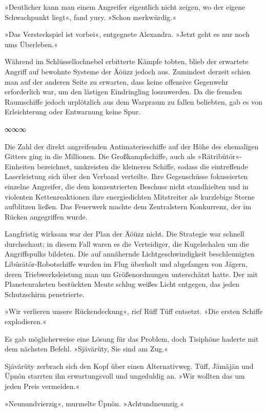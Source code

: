 »Deutlicher kann man einem Angreifer eigentlich nicht zeigen, wo der eigene Schwachpunkt liegt«, fand yury. »Schon merkwürdig.«

»Das Versteckspiel ist vorbei«, entgegnete Alexandra. »Jetzt geht es nur noch ums Überleben.«

Während im Schlüssellochnebel erbitterte Kämpfe tobten, blieb der erwartete Angriff auf bewohnte Systeme der Äöüzz jedoch aus. Zumindest derzeit schien man auf der anderen Seite zu erwarten, dass keine offensive Gegenwehr erforderlich war, um den lästigen Eindringling loszuwerden. Da die fremden Raumschiffe jedoch urplötzlich aus dem Warpraum zu fallen beliebten, gab es von Erleichterung oder Entwarnung keine Spur.

\begin{center}
∞∞∞
\end{center}

Die Zahl der direkt angreifenden Antimaterieschiffe auf der Höhe des ehemaligen Gitters ging in die Millionen. Die Großkampfschiffe, auch als »Rätribütör«-Einheiten bezeichnet, umkreisten die kleineren Schiffe, sodass die eintreffende Laserleistung sich über den Verband verteilte. Ihre Gegenschüsse fokussierten einzelne Angreifer, die dem konzentrierten Beschuss nicht standhielten und in violenten Kettenreaktionen ihre energiedichten Mitstreiter als kurzlebige Sterne aufblitzen ließen. Das Feuerwerk machte dem Zentralstern Konkurrenz, der im Rücken angegriffen wurde.

Langfristig wirksam war der Plan der Äöüzz nicht. Die Strategie war schnell durchschaut; in diesem Fall waren es die Verteidiger, die Kugelschalen um die Angriffspulks bildeten. Die auf annähernde Lichtgeschwindigkeit beschleunigten Libürätör-Robotschiffe wurden im Flug überholt und abgefangen von Jägern, deren Triebwerksleistung man um Größenordnungen unterschätzt hatte. Der mit Planetenraketen bestückten Meute schlug weißes Licht entgegen, das jeden Schutzschirm penetrierte.

»Wir verlieren unsere Rückendeckung«, rief Rüff Tüff entsetzt. »Die ersten Schiffe explodieren.«

Es gab möglicherweise eine Lösung für das Problem, doch Tisiphöne haderte mit dem nächsten Befehl. »Sjävärüty, Sie sind am Zug.«

Sjävärüty zerbrach sich den Kopf über einen Alternativweg. Tüff, Jämäjän und Üpnön starrten ihn erwartungsvoll und ungeduldig an. »Wir wollten das um jeden Preis vermeiden.«

»Neunundvierzig«, murmelte Üpnön. »Achtundneunzig.«

